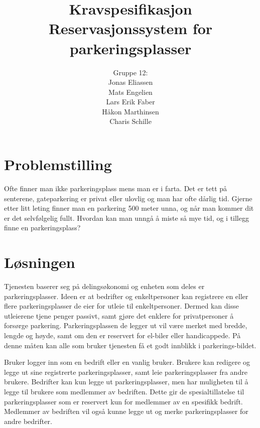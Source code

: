 \documentclass[12pt]{article}
\begin{document}
\title{%
    Kravspesifikasjon\\
    \large Reservasjonssystem for parkeringsplasser}
\author{%
    Gruppe 12:\\
    Jonas Eliassen\\
    Mats Engelien\\
    Lars Erik Faber\\
    Håkon Marthinsen\\
    Charis Schille}
\date{}
\maketitle

\newpage

\tableofcontents

\newpage

\section{Problemstilling}

Ofte finner man ikke parkeringsplass mens man er i farta. Det er tett på senterene, gateparkering er privat eller ulovlig og man har ofte dårlig tid. Gjerne etter litt leting finner man en parkering 500 meter unna, og når man kommer dit er det selvfølgelig fullt. Hvordan kan man unngå å miste så mye tid, og i tillegg finne en parkeringsplass?

\section{Løsningen}
Tjenesten baserer seg på delingsøkonomi og enheten som deles er parkeringsplasser. Ideen er at bedrifter og enkeltpersoner kan registrere en eller flere parkeringsplasser de eier for utleie til enkeltpersoner. Dermed kan disse utleierene tjene penger passivt, samt gjøre det enklere for privatpersoner å forsørge parkering. Parkeringsplassen de legger ut vil være merket med bredde, lengde og høyde, samt om den er reservert for el-biler eller handicappede. På denne måten kan alle som bruker tjenesten få et godt innblikk i parkerings-bildet.

Bruker logger inn som en bedrift eller en vanlig bruker. Brukere kan redigere og legge ut sine registrerte parkeringsplasser, samt leie parkeringsplasser fra andre brukere. Bedrifter kan kun legge ut parkeringsplasser, men har muligheten til å legge til brukere som medlemmer av bedriften. Dette gir de spesialtillatelse til parkeringsplasser som er reservert kun for medlemmer av en spesifikk bedrift. Medlemmer av bedriften vil også kunne legge ut og merke parkeringsplasser for andre bedrifter.
\end{document}

